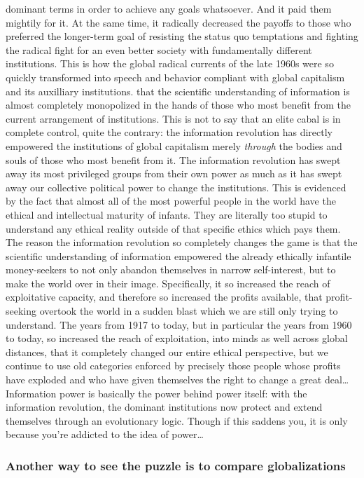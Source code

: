 \documentclass[12pt,book]{article}
\begin{document}
dominant terms in order to achieve any goals whatsoever. And it paid
them mightily for it. At the same time, it radically decreased the
payoffs to those who preferred the longer-term goal of resisting the
status quo temptations and fighting the radical fight for an even better
society with fundamentally different institutions. This is how the
global radical currents of the late 1960s were so quickly transformed
into speech and behavior compliant with global capitalism and its
auxilliary institutions. that the scientific understanding of
information is almost completely monopolized in the hands of those who
most benefit from the current arrangement of institutions. This is not
to say that an elite cabal is in complete control, quite the contrary:
the information revolution has directly empowered the institutions of
global capitalism merely \emph{through} the bodies and souls of those
who most benefit from it. The information revolution has swept away its
most privileged groups from their own power as much as it has swept away
our collective political power to change the institutions. This is
evidenced by the fact that almost all of the most powerful people in the
world have the ethical and intellectual maturity of infants. They are
literally too stupid to understand any ethical reality outside of that
specific ethics which pays them. The reason the information revolution
so completely changes the game is that the scientific understanding of
information empowered the already ethically infantile money-seekers to
not only abandon themselves in narrow self-interest, but to make the
world over in their image. Specifically, it so increased the reach of
exploitative capacity, and therefore so increased the profits available,
that profit-seeking overtook the world in a sudden blast which we are
still only trying to understand. The years from 1917 to today, but in
particular the years from 1960 to today, so increased the reach of
exploitation, into minds as well across global distances, that it
completely changed our entire ethical perspective, but we continue to
use old categories enforced by precisely those people whose profits have
exploded and who have given themselves the right to change a great
deal\ldots{} Information power is basically the power behind power
itself: with the information revolution, the dominant institutions now
protect and extend themselves through an evolutionary logic. Though if
this saddens you, it is only because you're addicted to the idea of
power\ldots{}

\subsubsection{Another way to see the puzzle is to compare
globalizations}\label{another-way-to-see-the-puzzle-is-to-compare-globalizations}
\end{document}
